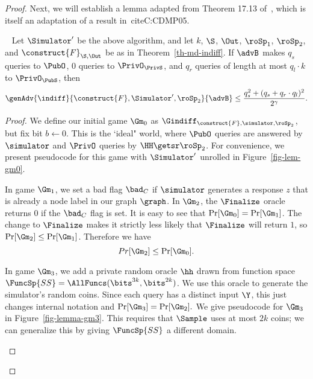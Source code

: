 \begin{proof}
	Next, we will establish a lemma adapted from Theorem 17.13 of~\cite{hfrobook}, which is itself an adaptation of a result in~cite{C:CDMP05}.
	\begin{lemma}~\cite{hfrobook}\label{th-chop-md-lemma} Let $\Simulator'$ be the above algorithm, and let $k$, $\S$, $\Out$, $\roSp_1$, $\roSp_2$, and $\construct{F}_{\S, \Out}$ be as in Theorem~\ref{th-md-indiff}. If $\advB$ makes $q_s$ queries to $\PubO$, $0$ queries to $\PrivO_{\PrivS}$, and $q_r$ queries of length at most $q_l \cdot k$ to $\PrivO_{\PubS}$, then 
		\[\genAdv{\indiff}{\construct{F},\Simulator',\roSp_2}{\advB} \leq \frac{q_s^2 + (q_s+q_r \cdot q_l)^2}{2^{\gamma}}.\]
	\end{lemma}
	\begin{proof}
		We define our initial game $\Gm_0$ as $\Gindiff_{\construct{F}, \simulator, \roSp_2}$, but fix bit $b\gets 0$. This is the `ideal" world, where $\PubO$ queries are answered by $\simulator$ and $\PrivO$ queries by $\HH\getsr \roSp_2$. For convenience, we present pseudocode for this game with $\Simulator'$ unrolled in Figure~\ref{fig-lem-gm0}.
		
		In game $\Gm_1$, we set a bad flag $\bad_C$ if $\simulator$ generates a response $z$ that is already a node label in our graph $\graph$. In $\Gm_2$, the $\Finalize$ oracle returns $0$ if the $\bad_C$ flag is set. It is easy to see that $\Pr[\Gm_0] = \Pr[\Gm_1]$. The change to $\Finalize$ makes it strictly less likely that $\Finalize$ will return $1$, so $\Pr[\Gm_2] \leq \Pr[\Gm_1]$. Therefore we have
		\[Pr[\Gm_2] \leq \Pr[\Gm_0].\]
		
		In game $\Gm_3$, we add a private random oracle $\hh$ drawn from function space $\FuncSp{SS} = \AllFuncs(\bits^{3k}, \bits^{2k})$. We use this oracle to generate the simulator's random coins. Since each query has a distinct input $\Y$, this just changes internal notation and $\Pr[\Gm_3] = \Pr[\Gm_2].$ We give pseudocode for $\Gm_3$ in Figure~\ref{fig-lemma-gm3}. {\color{red} This requires that $\Sample$ uses at most $2k$ coins; we can generalize this by giving $\FuncSp{SS}$ a different domain.} 
		
			\begin{figure}
			
\end{figure}
\end{proof}
\end{proof}
